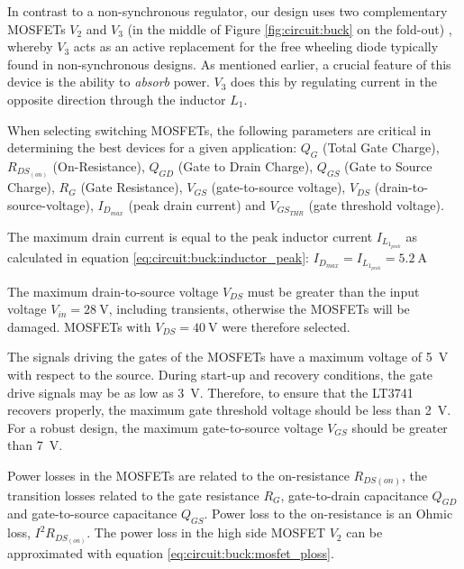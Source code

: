 In contrast to a non-synchronous  regulator, our design uses two complementary
MOSFETs $V_2$ and $V_3$ (in the middle of Figure \ref{fig:circuit:buck} on the
fold-out) , whereby $V_3$ acts as  an active replacement for the free wheeling
diode  typically found  in  non-synchronous designs. As  mentioned earlier,  a
crucial feature of  this device is the ability to  \emph{absorb} power.  $V_3$
does this by regulating current in the opposite direction through the inductor
$L_1$.

When  selecting  switching  MOSFETs,  the  following  parameters are critical in
determining the best devices for a given application: $Q_G$ (Total Gate Charge),
$R_{DS_{(on)}}$ (On-Resistance), $Q_{GD}$ (Gate to Drain Charge), $Q_{GS}$ (Gate
to Source  Charge),  $R_G$ (Gate Resistance), $V_{GS}$ (gate-to-source voltage),
$V_{DS}$  (drain-to-source-voltage),  $I_{D_{max}}$  (peak  drain  current)  and
$V_{GS_{THR}}$ (gate threshold voltage).

The     maximum     drain     current     is     equal     to     the     peak
inductor    current    $I_{L_{1_{peak}}}$    as   calculated    in    equation
\ref{eq:circuit:buck:inductor_peak}: $I_{D_{max}}    =   I_{L_{1_{peak}}}    =
\SI{5.2}{\ampere}$


The maximum  drain-to-source voltage $V_{DS}$  must be greater than  the input
voltage  $V_{in}  =  \SI{28}{\volt}$,  including  transients,   otherwise  the
MOSFETs will be damaged. MOSFETs with $V_{DS} = \SI{40}{\volt}$ were therefore
selected.

The  signals driving  the  gates of  the  MOSFETs have  a  maximum voltage  of
\SI{5}{\volt}  with  respect to  the  source.   During start-up  and  recovery
conditions, the gate drive signals  may be as low as \SI{3}{\volt}. Therefore,
to  ensure that  the  LT3741  recovers properly,  the  maximum gate  threshold
voltage should  be less than  \SI{2}{\volt}. For a robust design,  the maximum
gate-to-source voltage $V_{GS}$ should be greater than \SI{7}{\volt}.

Power losses in  the MOSFETs are related to  the on-resistance $R_{DS{(on)}}$,
the  transition losses  related to  the gate  resistance $R_G$,  gate-to-drain
capacitance  $Q_{GD}$  and  gate-to-source  capacitance  $Q_{GS}$. Power  loss
to  the  on-resistance  is  an  Ohmic  loss,  $I^2  R_{DS_{(on)}}$. The  power
loss  in  the  high  side  MOSFET $V_2$  can  be  approximated  with  equation
\ref{eq:circuit:buck:mosfet_ploss}.

